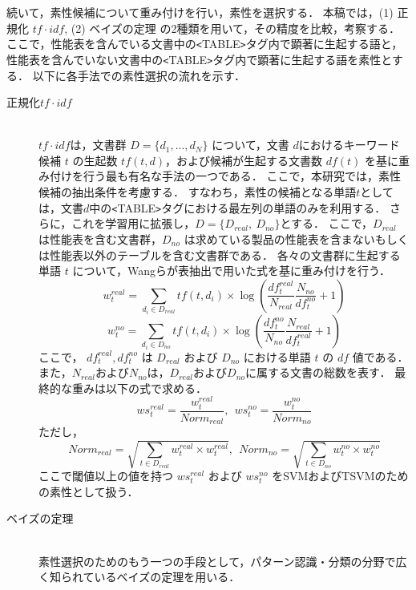 続いて，素性候補について重み付けを行い，素性を選択する．
本稿では，(1) 正規化 $tf \cdot idf$, (2) ベイズの定理 の2種類を用いて，その精度を比較，考察する．
ここで，性能表を含んでいる文書中の\verb+<+TABLE\verb+>+タグ内で顕著に生起する語と，性能表を含んでいない文書中の\verb+<+TABLE\verb+>+タグ内で顕著に生起する語を素性とする．
以下に各手法での素性選択の流れを示す．
\begin{description}
\item[正規化$tf \cdot idf$]\mbox{}\\
$tf\cdot idf$は，文書群 $D=\{d_1,...,d_N\}$ について，文書 $d$におけるキーワード候補 $t$ の生起数 $tf(t,d)$，および候補が生起する文書数 $df(t)$ を基に重み付けを行う最も有名な手法の一つである．
ここで，本研究では，素性候補の抽出条件を考慮する．
すなわち，素性の候補となる単語$t$としては，文書$d$中の\verb+<+TABLE\verb+>+タグにおける最左列の単語のみを利用する．
さらに，これを学習用に拡張し，$D=\{D_{real},~D_{no}\}$とする．
ここで，$D_{real}$ は性能表を含む文書群，$D_{no}$ は求めている製品の性能表を含まないもしくは性能表以外のテーブルを含む文書群である．
各々の文書群に生起する単語 $t$ について，Wangら\cite{wang}が表抽出で用いた式を基に重み付けを行う．
\begin{equation}
 w^{real}_t = \sum_{d_i \in D_{real}}tf(t, d_i) \times \log(\frac{df^{real}_t}{N_{real}}\frac{N_{no}}{df^{no}_t}+1)
\end{equation}
\begin{equation}
w^{no}_t = \sum_{d_i \in D_{no}}tf(t, d_i) \times \log(\frac{df^{no}_t}{N_{no}}\frac{N_{real}}{df^{real}_t}+1)
\end{equation}
ここで， $df^{real}_{t},df^{no}_{t}$ は $D_{real}$ および $D_{no}$ における単語 $t$ の $df$ 値である．また，$N_{real}$および$N_{no}$は，$D_{real}$および$D_{no}$に属する文書の総数を表す．
最終的な重みは以下の式で求める．
\begin{equation}
ws^{real}_t = \frac{w^{real}_t}{Norm_{real}},~~ws^{no}_t = \frac{w^{no}_t}{Norm_{no}}
\end{equation}
ただし，
\begin{equation}
Norm_{real} = \sqrt{\sum_{t \in D_{real}} w^{real}_t \times w^{real}_t},~~Norm_{no} = \sqrt{\sum_{t \in D_{no}} w^{no}_t \times w^{no}_t}
\end{equation}
ここで閾値以上の値を持つ $ws^{real}_t$ および $ws^{no}_t$ をSVMおよびTSVMのための素性として扱う．
\item[ベイズの定理]\mbox{}\\
素性選択のためのもう一つの手段として，パターン認識・分類の分野で広く知られているベイズの定理を用いる．

\end{description}
